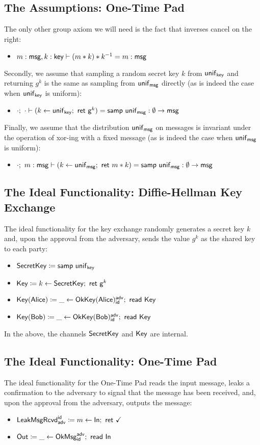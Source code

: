 \subsection{The Assumptions: One-Time Pad}
The only other group axiom we will need is the fact that inverses cancel on the right:
\begin{itemize}
\item $m : \mathsf{msg}, k : \mathsf{key} \vdash (m * k) * k^{-1} = m : \mathsf{msg}$
\end{itemize}
Secondly, we assume that sampling a random secret key $k$ from $\mathsf{unif}_{\mathsf{key}}$ and returning $g^k$ is the same as sampling from $\mathsf{unif}_{\mathsf{msg}}$ directly (as is indeed the case when $\mathsf{unif}_{\mathsf{key}}$ is uniform):
\begin{itemize}
\item $\cdot; \ \cdot \vdash (k \leftarrow \mathsf{unif}_{\mathsf{key}}; \ \mathsf{ret} \ \mathsf{g}^k) = \mathsf{samp} \ \mathsf{unif}_{\mathsf{msg}} : \emptyset \to \mathsf{msg}$
\end{itemize}
Finally, we assume that the distribution $\mathsf{unif}_{\mathsf{msg}}$ on messages is invariant under the operation of xor-ing with a fixed message (as is indeed the case when $\mathsf{unif}_{\mathsf{msg}}$ is uniform):
\begin{itemize}
\item $\cdot; \ m : \mathsf{msg} \vdash (k \leftarrow \mathsf{unif}_{\mathsf{msg}}; \ \mathsf{ret} \ m * k) = \mathsf{samp} \ \mathsf{unif}_{\mathsf{msg}} : \emptyset \to \mathsf{msg}$
\end{itemize}

\subsection{The Ideal Functionality: Diffie-Hellman Key Exchange}
The ideal functionality for the key exchange randomly generates a secret key $k$ and, upon the approval from the adversary, sends the value $g^k$ as the shared key to each party:
\begin{itemize}
\item $\mathsf{SecretKey} \coloneqq \mathsf{samp} \ \mathsf{unif}_{\mathsf{key}}$
\item $\mathsf{Key} \coloneqq k \leftarrow \mathsf{SecretKey}; \ \mathsf{ret} \ \mathsf{g}^k$
\item $\mathsf{Key}(\mathsf{Alice}) \coloneqq \_ \leftarrow \mathsf{OkKey}(\mathsf{Alice})^{\mathsf{adv}}_{\mathsf{id}}; \ \mathsf{read} \ \mathsf{Key}$
\item $\mathsf{Key}(\mathsf{Bob}) \coloneqq \_ \leftarrow \mathsf{OkKey}(\mathsf{Bob})^{\mathsf{adv}}_{\mathsf{id}}; \ \mathsf{read} \ \mathsf{Key}$
\end{itemize}
In the above, the channels $\mathsf{SecretKey}$ and $\mathsf{Key}$ are internal.

\subsection{The Ideal Functionality: One-Time Pad}
The ideal functionality for the One-Time Pad reads the input message, leaks a confirmation to the adversary to signal that the message has been received, and, upon the approval from the adversary, outputs the message:
\begin{itemize}
\item $\mathsf{LeakMsgRcvd}^{\mathsf{id}}_{\mathsf{adv}} \coloneqq m \leftarrow \mathsf{In}; \ \mathsf{ret} \ \checkmark$
\item $\mathsf{Out} \coloneqq \_ \leftarrow \mathsf{OkMsg}^{\mathsf{adv}}_{\mathsf{id}}; \ \mathsf{read} \ \mathsf{In}$
\end{itemize}

